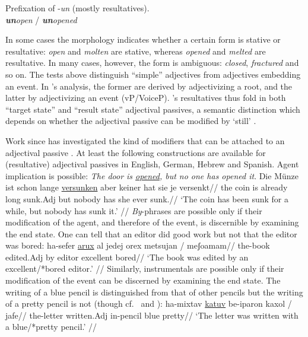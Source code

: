 \ex Prefixation of -\emph{un} (mostly resultatives).\\
	\xmark \emph{\textbf{un}open} / \cmark \emph{\textbf{un}opened}
\xe

In some cases the morphology indicates whether a certain form is stative or resultative: \emph{open} and \emph{molten} are stative, whereas \emph{opened} and \emph{melted} are resultative. In many cases, however, the form is ambiguous: \emph{closed}, \emph{fractured} and so on. The tests above distinguish ``simple'' adjectives from adjectives embedding an event. In \citeauthor{embick04li}'s analysis, the former are derived by adjectivizing a root, and the latter by adjectivizing an event (vP/VoiceP). \citeauthor{embick04li}'s resultatives thus fold in both ``target state'' and ``result state'' adjectival passives, a semantic distinction which depends on whether the adjectival passive can be modified by `still' \citep{kratzer00bls,alexiadouetal14}.

Work since has investigated the kind of modifiers that can be attached to an adjectival passive \citep{meltzerasscher11,mcintyre13,alexiadouetal14,bruening14nllt,gehrkemarco14}. At least the following constructions are available for (resultative) adjectival passives in English, German, Hebrew and Spanish{. Agent implication is possible:}
\pex
	\a \ljudge{*} \emph{The door is \underline{opened}, but no one has opened it}.
	\a \ljudge{*} \begingl
		\gla Die M\"unze ist schon lange \underline{versunken} aber keiner hat sie je versenkt//
		\glb the coin is already long sunk.Adj but nobody has she ever sunk.//
		\glft `The coin has been sunk for a while, but nobody has sunk it.' //
	\endgl
\xe
{\emph{By}-phrases are possible only if their modification of the agent, and therefore of the event, is discernible by examining the end state. One can tell that an editor did good work but not that the editor was bored:}
\ex
	\begingl
		\gla ha-sefer \underline{arux} {al jedej} orex {\cmark}metsujan / {\xmark}meʃoamam//
		\glb the-book edited.Adj by editor \phantom{\cmark}excellent {} \phantom{\xmark}bored//
		\glft `The book was edited by an excellent/*bored editor.' //
	\endgl
\xe
{Similarly, instrumentals are possible only if their modification of the event can be discerned by examining the end state. The writing of a blue pencil is distinguished from that of other pencils but the writing of a pretty pencil is not} (though cf.~\citealt{mcintyre13} and \citealt{bruening14nllt}):
\ex
	\begingl
		\gla ha-mixtav \underline{katuv} be-iparon {\cmark}kaxol / {\xmark}jafe//
		\glb the-letter written.Adj in-pencil \phantom{\cmark}blue {} \phantom{\xmark}pretty//
		\glft `The letter was written with a blue/*pretty pencil.' //
	\endgl
\xe

